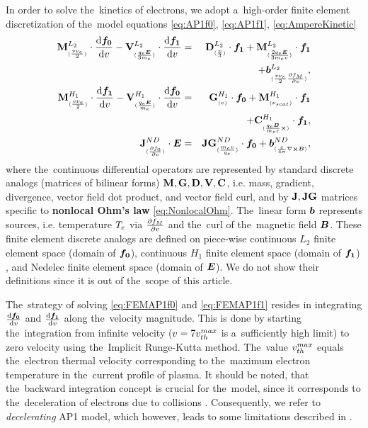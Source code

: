 In order to solve the~kinetics of electrons, we adopt a~high-order 
finite element discretization 
\cite{Dobrev_Kolev_Rieben-High-order_curvilinear_finite_element_methods_for_Lagrangian_hydrodynamics, mfem-library} 
of the~model equations \eqref{eq:AP1f0}, \eqref{eq:AP1f1}, 
\eqref{eq:AmpereKinetic}
\begin{eqnarray}
  \mathbf{M}^{L_2}_{_{(\frac{v\nu_{e}}{2})}}\cdot\frac{\text{d} \boldsymbol{f_0}}{\text{d} v} 
  - \mathbf{V}^{L_2}_{_{(\frac{q_e\boldsymbol{E}}{3m_e})}}\cdot\frac{\text{d} {\boldsymbol{f_1}}}{\text{d} v}
  &=&
  \mathbf{D}^{L_2}_{_{(\frac{v}{3})}}\cdot{\boldsymbol{f_1}} 
  + \mathbf{M}^{L_2}_{_{(\frac{2q_e\boldsymbol{E}}{3m_ev})}}\cdot{\boldsymbol{f_1}}
  \nonumber \\ 
  &&+ \boldsymbol{b}^{L_2}_{_{(\frac{v\nu_{e}}{2}\frac{\partial{f_M}}{\partial{v}})}}, 
  \label{eq:FEMAP1f0}
  \\
  \mathbf{M}^{H_1}_{_{(\frac{v\nu_{e}}{2})}}\cdot\frac{\text{d} {\boldsymbol{f_1}}}{\text{d} v}
  - \mathbf{V}^{H_1}_{_{(\frac{q_e\boldsymbol{E}}{m_e})}}\cdot\frac{\text{d} \boldsymbol{f_0}}{\text{d} v}
   &=& 
  \mathbf{G}^{H_1}_{_{(v)}}\cdot\boldsymbol{f_0} 
  + \mathbf{M}^{H_1}_{_{(\nu_{scat})}}\cdot{\boldsymbol{f_1}} 
  \nonumber \\
  && + \mathbf{C}^{H_1}_{_{(\frac{q_e\boldsymbol{B}}{m_e c}\boldsymbol{\times})}}\cdot{\boldsymbol{f_1}}
  ,
  \label{eq:FEMAP1f1}\\
  \mathbf{J}^{ND}_{_{(\frac{\partial{f_0}}{\partial{v}})}}\cdot\boldsymbol{E} 
  &=& 
  \mathbf{JG}^{ND}_{_{(\frac{m_ev}{q_e})}}\cdot\boldsymbol{f_0}
  + \boldsymbol{b}^{ND}_{_{(\frac{c}{4\pi} \nabla\boldsymbol{\times}\boldsymbol{B})}} 
  ,
  \nonumber \\
  \label{eq:FEMAmpereKinetic}
\end{eqnarray}
where the~continuous differential operators are represented by standard 
discrete analogs (matrices of bilinear forms) 
$\mathbf{M}, \mathbf{G}, \mathbf{D}, \mathbf{V}, \mathbf{C}$, i.e. mass, gradient, 
divergence, vector field dot product, and vector field curl, and
by $\mathbf{J}, \mathbf{JG}$ matrices specific to {\bf nonlocal Ohm's law} 
\eqref{eq:NonlocalOhm}. The~linear form $\boldsymbol{b}$ represents sources, i.e.
temperature $T_e$ via $\frac{\partial{f_M}}{\partial{v}}$ and the~curl of 
the~magnetic field $\boldsymbol{B}$. These finite element discrete analogs are defined
on piece-wise continuous $L_2$ finite element space (domain of $\boldsymbol{f_0}$),
continuous $H_1$ finite element space (domain of ${\boldsymbol{f_1}}$) 
\cite{Dobrev_Kolev_Rieben-High-order_curvilinear_finite_element_methods_for_Lagrangian_hydrodynamics}, 
and Nedelec finite element space (domain of $\boldsymbol{E}$). We do not show their
definitions since it is out of the~scope of this article. 

The~strategy of solving 
\eqref{eq:FEMAP1f0} and \eqref{eq:FEMAP1f1} resides in integrating 
$\frac{\text{d} \boldsymbol{f_0}}{\text{d} v}$
and $\frac{\text{d} {\boldsymbol{f_1}}}{\text{d} v}$ along the~velocity magnitude. 
This is done by starting the~integration
from infinite velocity ($v = 7 v_{th}^{max}$ is a~sufficiently high limit) 
to zero velocity using the~Implicit Runge-Kutta method. The~value
$v_{th}^{max}$ equals the~electron thermal velocity corresponding to the~maximum 
electron temperature in the~current profile of plasma.
It should be noted, that the~backward integration concept is crucial for 
the~model, since it corresponds to the~deceleration of electrons due to 
collisions \cite{Touati_2014}. Consequently, we refer to 
\textit{decelerating} AP1 model, which however, leads to some limitations 
described in . 

